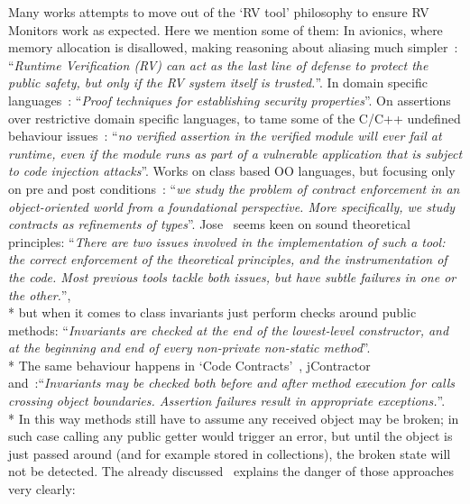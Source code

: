 \noindent Many works attempts to move out of the `RV tool' philosophy to ensure RV Monitors work as expected. Here
we mention some of them:
\sepItems
In avionics, where memory allocation is disallowed, making reasoning about aliasing much simpler~\cite{laurent2015assuring}:
``\emph{Runtime Verification (RV) can act as the last line of defense to
protect the public safety, but only if the RV system itself is trusted.}''.
\sepItems
In domain specific languages~\cite{ferrari2002guardians}:
``\emph{Proof techniques for establishing security properties}''.
\sepItems
On assertions over restrictive domain specific languages, to tame some of the C/C++
undefined behaviour issues~\cite{agten2015sound}:
``\emph{no verified assertion in the verified
module will ever fail at runtime, even if the module runs as part of
a vulnerable application that is subject to code injection attacks}''.
\sepItems
Works on class based OO languages, but focusing only on pre and post conditions~\cite{findler2001contract}:
``\emph{we  study  the  problem  of  contract  enforcement in
an object-oriented world from  a foundational perspective.   More
specifically, we study contracts as refinements of types}''.
\sepItems
Jose~\cite{feldman2006jose} seems keen on sound theoretical principles:
``\emph{There are two issues involved
in the implementation of such a tool: the correct enforcement of the theoretical principles, and the instrumentation
of the code. Most previous tools tackle both issues, but have
subtle failures in one or the other.}'',\\*
but when it comes to class invariants just perform checks around public methods:
``\emph{Invariants are checked at the end of the lowest-level constructor,
 and at the beginning and end of every non-private non-static method}''.\\*
The same behaviour happens in `Code Contracts'~\cite{fahndrich2010embedded},
jContractor~\cite{abercrombie2002jcontractor}
and~\cite{tran2003design}:``\emph{Invariants may be checked both before and after
method  execution  for  calls  crossing  object  boundaries.
Assertion  failures  result  in  appropriate  exceptions.}''.\\*
In this way methods still have to assume any received object may be broken; in such case calling any
public getter would trigger an error, but until the object is just passed around
(and for example stored in collections), the broken state will not be detected.
The already discussed~\cite{Gopinathan:2008:RMO:1483018.1483028}
explains the danger of those approaches very clearly:
